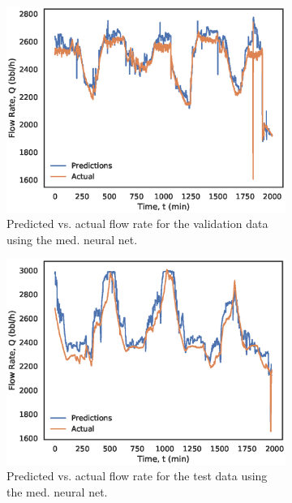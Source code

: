 \begin{figure}[p]
     \begin{subfigure}[b]{0.48\textwidth}
         \includegraphics[width=\textwidth]{images/08mednn_valid.eps}
         \caption{Predicted vs. actual flow rate for the validation data using the med. neural net.}
         \label{fig:08mednn_valid}
     \end{subfigure}
     \begin{subfigure}[b]{0.48\textwidth}
         \includegraphics[width=\textwidth]{images/08mednn_test.eps}
         \caption{Predicted vs. actual flow rate for the test data using the med. neural net.}
         \label{fig:08mednn_test}
     \end{subfigure}
     \begin{subfigure}[b]{0.48\textwidth}

\end{subfigure}
\end{figure}
